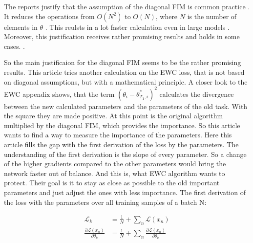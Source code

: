 The reports \cite{better-weight-consolidation,elastic-weight-consolidation} justify that the assumption of the diagonal FIM is common practice \cite{elastic-weight-consolidation,better-weight-consolidation,incremental-moment-matching}.
It reduces the operations from $O(N^2)$ to $O(N)$, where $N$ is the number of elements in $\theta$ \cite{elastic-weight-consolidation,better-weight-consolidation}.
This reulsts in a lot faster calculation even in large models \cite{elastic-weight-consolidation,better-weight-consolidation}.
Moreover, this justification receives rather promising results and holds in some cases.
\cite{elastic-weight-consolidation,incremental-moment-matching}.

So the main justificaion for the diagonal FIM seems to be the rather promising results.
\newline
This article tries another calculation on the EWC loss, that is not based on diagonal assumptions, but with a mathematical principle.
\newline
A closer look to the EWC appendix shows, that the term $(\theta_i - \theta^*_{T_1,i})^2$ calculates the divergence between the new calculated parameters and the parameters of the old task.
With the square they are made positive.
At this point is the original algorithm multiplied by the diagonal FIM, which provides the importance.
So this article wants to find a way to measure the importance of the parameters.
Here this article fills the gap with the first derivation of the loss by the parameters.
The understanding of the first derivation is the slope of every parameter.
So a change of the higher gradients compared to the other parameters would bring the network faster out of balance.
And this is, what EWC algorithm wants to protect. Their goal is it to stay as close as possible to the old important parameters and just adjust the ones with less importance.
The first derivation of the loss with the parameters over all training samples of a batch N:

\begin{equation}
    \begin{split}
        \mathcal{L}_k & = 
        \frac{1}{N}
        + \sum_{n} 
            \mathcal{L}(x_n)
        \\
        \frac{\partial \mathcal{L}(x_n)}{\partial \theta_k} & = 
        \frac{1}{N}
        + \sum_{n} 
            \frac{\partial \mathcal{L}(x_n)}{\partial \theta_k}
    \end{split}
\end{equation}

